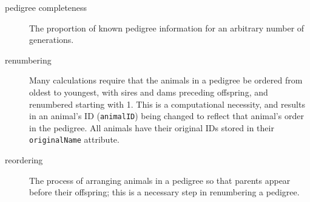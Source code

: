 \begin{description}
\item[pedigree completeness] The proportion of known pedigree information for an arbitrary number of generations.
\item[renumbering] Many calculations require that the animals in a pedigree be ordered from oldest to youngest, with sires and dams preceding offspring, and renumbered  starting with 1.  This is a computational necessity, and results in an animal's ID (\texttt{animalID}) being changed to reflect that animal's order in the pedigree.  All animals have their original IDs stored in their \texttt{originalName} attribute.
\item[reordering] The process of arranging animals in a pedigree so that parents appear before their offspring; this is a necessary step in renumbering a pedigree.
\end{description}